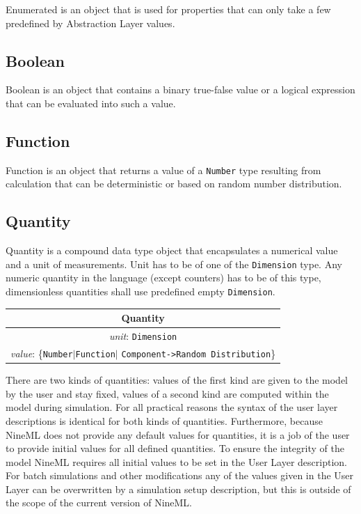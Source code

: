 \documentclass{article}
\begin{document}
Enumerated is an object that is used for properties that can only take
a few predefined by Abstraction Layer values.

\subsection{Boolean}

Boolean is an object that contains a binary true-false value or a logical
expression that can be evaluated into such a value.

\subsection{Function}

Function is an object that returns a value of a {\tt Number} type resulting
from calculation that can be deterministic or based on random number
distribution.

\subsection{Quantity}

Quantity is a compound data type object that encapsulates a numerical value
and a unit of measurements. Unit has to be of one of the {\tt Dimension} type.
Any numeric quantity in the language (except counters) has to be of this type,
dimensionless quantities shall use predefined empty {\tt Dimension}.

\begin{table}[htb]
\center
\begin{tabular}{|c|}
\hline
\hline
Quantity \\
\hline
\hline
{\em unit}: {\tt Dimension} \\
\hline
{\em value}: \{{\tt Number}$|${\tt Function}$|$%
{\tt Component->Random Distribution}\} \\
\hline
\end{tabular}
\end{table}

There are two kinds of quantities: values of the first kind are given to the
model by the user and stay fixed, values of a second kind are computed within
the model during simulation. For all practical reasons the syntax of the user
layer descriptions is identical for both kinds of quantities. Furthermore,
because NineML does not provide any default values for quantities, it is a
job of the user to provide initial values for all defined quantities. To
ensure the integrity of the model NineML requires all initial values to be
set in the User Layer description. For batch simulations and other
modifications any of the values given in the User Layer can be overwritten
by a simulation setup description, but this is outside of the scope of the
current version of NineML.
\end{document}
